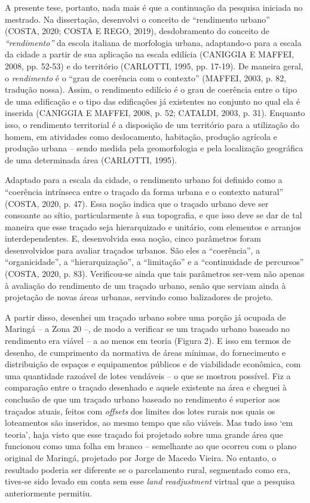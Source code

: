 \documentclass[twoside, 12pt, english,italian,latin,greek,french,spanish,brazil]{book}
\begin{document}
        A presente tese, portanto, nada mais é que a continuação da pesquisa iniciada no mestrado.  Na dissertação, desenvolvi o conceito de “rendimento urbano” (COSTA, 2020; COSTA E REGO, 2019), desdobramento do conceito de \textit{“rendimento”} da escola italiana de morfologia urbana,   adaptando-o para a escala da cidade a partir de sua aplicação na escala edilícia (CANIGGIA E MAFFEI, 2008, pp. 52-53) e do território (CARLOTTI, 1995, pp. 17-19). De maneira geral, o \textit{rendimento} é o “grau de coerência com o contexto” (MAFFEI, 2003, p. 82, tradução nossa). Assim, o rendimento edilício é o grau de coerência entre o tipo  de uma edificação e o tipo das edificações já existentes no conjunto no qual ela é inserida (CANIGGIA E MAFFEI, 2008, p. 52; CATALDI, 2003, p. 31). Enquanto isso, o rendimento territorial é a disposição de um território para a utilização do homem,  em atividades como deslocamento, habitação, produção agrícola e produção urbana – sendo medida pela geomorfologia e pela localização geográfica de uma determinada área  (CARLOTTI, 1995). 

        Adaptado para a escala da cidade, o rendimento urbano foi definido como a “coerência intrínseca entre o traçado da forma urbana e o contexto natural” (COSTA, 2020, p. 47). Essa noção indica que o traçado urbano deve ser consoante ao sítio, particularmente à sua topografia, e que isso deve se dar de tal maneira que esse traçado seja hierarquizado e unitário, com elementos e arranjos interdependentes. E, desenvolvida essa noção, cinco parâmetros foram desenvolvidos para avaliar traçados urbanos. São eles a “coerência”, a “organicidade”, a “hierarquização”, a “limitação” e a “continuidade de percursos” (COSTA, 2020, p. 83). Verificou-se ainda que tais parâmetros ser-vem não apenas à avaliação do rendimento de um traçado urbano, senão que serviam ainda à projetação de novas áreas urbanas, servindo como balizadores de projeto. 

        A partir disso, desenhei um traçado urbano sobre uma porção já ocupada de Maringá – a Zona 20 –, de modo a verificar se um traçado urbano baseado no rendimento era viável – a ao menos em teoria (Figura 2). E isso em termos de desenho, de cumprimento da normativa de áreas mínimas, do fornecimento e distribuição de espaços e equipamentos públicos e de viabilidade econômica, com uma quantidade razoável de lotes vendáveis – o que se mostrou possível. Fiz a comparação entre o traçado desenhado e aquele existente na área e cheguei à conclusão de que um traçado urbano baseado no rendimento é superior aos traçados atuais, feitos com \textit{offsets} dos limites dos lotes rurais nos quais os loteamentos são inseridos, ao mesmo tempo que são viáveis. Mas tudo isso ‘em teoria’, haja visto que esse traçado foi projetado sobre uma grande área que funcionou como uma folha em branco – semelhante ao que ocorreu com o plano original de Maringá, projetado por Jorge de Macedo Vieira. No entanto, o resultado poderia ser diferente se o parcelamento rural, segmentado como era, tives-se sido levado em conta sem esse \textit{land readjustment} virtual que a pesquisa anteriormente permitiu.
 
\end{document}
